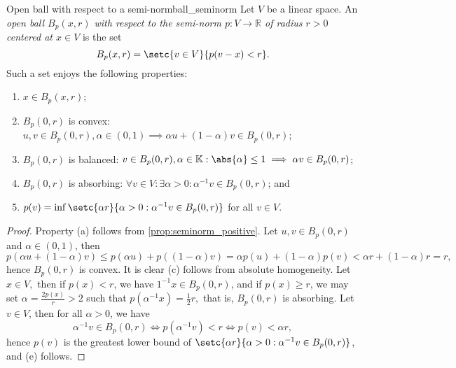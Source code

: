 \begin{proposition}{Open ball with respect to a semi-norm}{ball_seminorm}
    Let \(V\) be a linear space. An \emph{open ball \(B_p(x, r)\) with respect to the semi-norm \(p : V \to \mathbb{R}\) of radius \(r > 0\) centered at \(x \in V\)} is the set
    \begin{equation*}
        B_p(x, r) = \setc{v \in V}{p(v - x) < r}.
    \end{equation*}
    Such a set enjoys the following properties:
    \begin{enumerate}[label=(\alph*)]
        \item \(x \in B_p(x, r)\);
        \item \(B_p(0, r)\) is convex: \(u, v \in B_p(0,r), \alpha \in (0,1) \implies \alpha u + (1 - \alpha)v \in B_p(0,r)\);
        \item \(B_p(0, r)\) is balanced: \(v \in B_p(0,r), \alpha \in \mathbb{K} : \abs{\alpha} \leq 1\implies \alpha v \in B_p(0,r)\);
        \item \(B_p(0, r)\) is absorbing: \(\forall v \in V : \exists \alpha > 0 : \alpha^{-1}v\in B_p(0,r)\); and
        \item \(p(v) = \inf\setc{\alpha r}{\alpha > 0 : \alpha^{-1} v \in B_p(0, r)}\) for all \(v \in V\).
    \end{enumerate}
\end{proposition}
\begin{proof}
    Property (a) follows from \cref{prop:seminorm_positive}. Let \(u, v \in B_p(0,r)\) and \(\alpha \in (0,1)\), then 
    \begin{equation*}
        p(\alpha u + (1 - \alpha)v) \leq p(\alpha u) + p((1 - \alpha)v) = \alpha p(u) + (1 - \alpha) p(v) < \alpha r + (1 - \alpha) r = r,
    \end{equation*}
    hence \(B_p(0,r)\) is convex. It is clear (c) follows from absolute homogeneity. Let \(x \in V,\) then if \(p(x) < r\), we have \(1^{-1}x \in B_p(0,r)\), and if \(p(x) \geq r\), we may set \(\alpha = \frac{2p(x)}{r} > 2\) such that \(p(\alpha^{-1} x) = \frac12r,\) that is, \(B_p(0,r)\) is absorbing. Let \(v \in V\), then for all \(\alpha > 0\), we have
    \begin{equation*}
        \alpha^{-1}v \in B_p(0,r) \iff p(\alpha^{-1}v) < r \iff p(v) < \alpha r,
    \end{equation*}
    hence \(p(v)\) is the greatest lower bound of \(\setc{\alpha r}{\alpha > 0 : \alpha^{-1} v \in B_p(0,r)}\), and (e) follows.
\end{proof}

